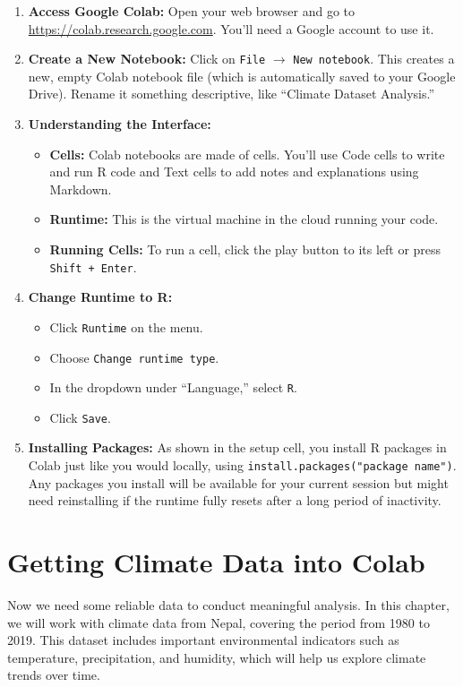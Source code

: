 \begin{enumerate}
    \item \textbf{Access Google Colab:} Open your web browser and go to \url{https://colab.research.google.com}. You’ll need a Google account to use it.
    \item \textbf{Create a New Notebook:} Click on \texttt{File} $\rightarrow$ \texttt{New notebook}. This creates a new, empty Colab notebook file (which is automatically saved to your Google Drive). Rename it something descriptive, like ``Climate Dataset Analysis.''
    \item \textbf{Understanding the Interface:}
    \begin{itemize}
        \item \textbf{Cells:} Colab notebooks are made of cells. You’ll use Code cells to write and run R code and Text cells to add notes and explanations using Markdown.
        \item \textbf{Runtime:} This is the virtual machine in the cloud running your code.
        \item \textbf{Running Cells:} To run a cell, click the play button to its left or press \texttt{Shift + Enter}.
    \end{itemize}
    \item \textbf{Change Runtime to R:}
    \begin{itemize}
        \item Click \texttt{Runtime} on the menu.
        \item Choose \texttt{Change runtime type}.
        \item In the dropdown under ``Language,'' select \texttt{R}.
        \item Click \texttt{Save}.
    \end{itemize}
    \item \textbf{Installing Packages:} As shown in the setup cell, you install R packages in Colab just like you would locally, using \texttt{install.packages("package name")}. Any packages you install will be available for your current session but might need reinstalling if the runtime fully resets after a long period of inactivity.
\end{enumerate}

\section{Getting Climate Data into Colab}

Now we need some reliable data to conduct meaningful analysis. In this chapter, we will work with climate data from Nepal, covering the period from 1980 to 2019. This dataset includes important environmental indicators such as temperature, precipitation, and humidity, which will help us explore climate trends over time.

